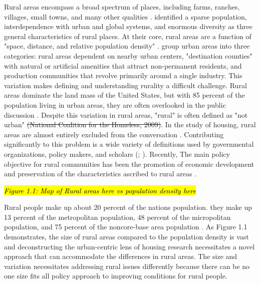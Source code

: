  Rural areas encompass a broad spectrum of places, including farms, ranches, villages, small towns, and many other qualities \citep{cromartie_defining_2008}. \citet{castle_conceptual_1998} identified a sparse population, interdependence with urban and global systems, and enormous diversity as three general characteristics of rural places.  At their core, rural areas are a function of "space, distance, and relative population density" \citep[?]{castle_place_2011}.\citet{shoup_principles_2010} group urban areas into three categories: rural areas dependent on nearby urban centers, "destination counties" with natural or artificial amenities that attract non-permanent residents, and production communities that revolve primarily around a single industry. This variation  makes defining and understanding rurality a difficult challenge. Rural areas dominate the land mass of the United States, but with 85 percent of the population living in urban areas, they are often overlooked in the public discussion \citep{pendall_future_2016}. Despite this variation in rural areas,  "rural" is often defined as "not urban" 
 \sout{(National Coalition for the Homeless, 2009)}. In the study of housing, rural areas are almost entirely excluded from the conversation \citep{gkartzios_housing_2017}. Contributing significantly to this problem is a wide variety of definitions used by governmental organizations, policy makers, and scholars (\citealp{yousey_defining_2018}; \citealp{cromartie_defining_2008}). Recently, The main policy objective for rural communities has been the promotion of economic development and preservation of the characteristics ascribed to rural areas \citep{lichter_changing_2007}. 

\textit{\hl{Figure 1.1: Map of Rural areas here vs population density here}} %

Rural people make up about 20 percent of the nations population. they make up 13 percent of the metropolitan population, 48 percent of the micropolitan population, and 75 percent of the noncore-base area population \citep{isserman_national_2005}. As Figure 1.1 demonstrates, the size of rural areas compared to the population density is vast and deconstructing the urban-centric lens of housing research necessitates a novel approach that can accommodate the differences in rural areas. The size and variation necessitates addressing rural issues differently because there can be no one size fits all policy approach to improving conditions for rural people. 

